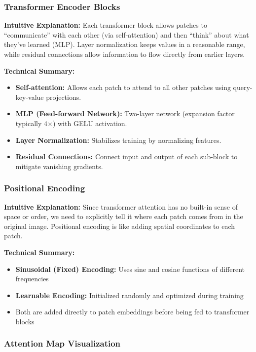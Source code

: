 \subsubsection*{Transformer Encoder Blocks}

\textbf{Intuitive Explanation:} Each transformer block allows patches to ``communicate'' with each other (via self-attention) and then ``think'' about what they've learned (MLP). Layer normalization keeps values in a reasonable range, while residual connections allow information to flow directly from earlier layers.

\textbf{Technical Summary:}
\begin{itemize}
    \item \textbf{Self-attention:} Allows each patch to attend to all other patches using query-key-value projections.
    \item \textbf{MLP (Feed-forward Network):} Two-layer network (expansion factor typically 4$\times$) with GELU activation.
    \item \textbf{Layer Normalization:} Stabilizes training by normalizing features.
    \item \textbf{Residual Connections:} Connect input and output of each sub-block to mitigate vanishing gradients.
\end{itemize}
\subsubsection*{Positional Encoding}

\textbf{Intuitive Explanation:} Since transformer attention has no built-in sense of space or order, we need to explicitly tell it where each patch comes from in the original image. Positional encoding is like adding spatial coordinates to each patch.

\textbf{Technical Summary:}
\begin{itemize}
    \item \textbf{Sinusoidal (Fixed) Encoding:} Uses sine and cosine functions of different frequencies
    \item \textbf{Learnable Encoding:} Initialized randomly and optimized during training
    \item Both are added directly to patch embeddings before being fed to transformer blocks
\end{itemize}

\subsubsection*{Attention Map Visualization}

